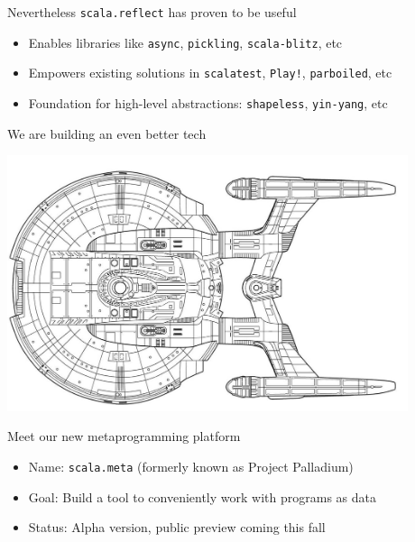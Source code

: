 \documentclass[svgnames,dvipsnames,hyperref={bookmarks=false},usepdftitle=false]{beamer}
\begin{document}
\begin{frame}{Nevertheless \texttt{scala.reflect} has proven to be useful}
\begin{itemize}
\item Enables libraries like \texttt{async}, \texttt{pickling}, \texttt{scala-blitz}, etc
\item Empowers existing solutions in \texttt{scalatest}, \texttt{Play!}, \texttt{parboiled}, etc
\item Foundation for high-level abstractions: \texttt{shapeless}, \texttt{yin-yang}, etc
\end{itemize}
\end{frame}

\begin{frame}[c, fragile]{We are building an even better tech}
\begin{center}
\includegraphics[height=7.5cm]{nx01-wireframe.jpg}
\end{center}
\end{frame}


\begin{frame}{Meet our new metaprogramming platform}
\begin{itemize}
\item Name: \texttt{scala.meta} (formerly known as Project Palladium)
\item Goal: Build a tool to conveniently work with programs as data
\item Status: Alpha version, public preview coming this fall
\end{itemize}
\end{frame}
\end{document}
